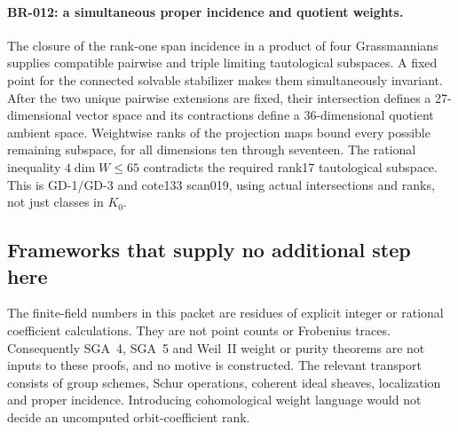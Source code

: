 \paragraph{BR-012: a simultaneous proper incidence and quotient weights.}
The closure of the rank-one span incidence in a product of four
Grassmannians supplies compatible pairwise and triple limiting
tautological subspaces. A fixed point for the connected solvable
stabilizer makes them simultaneously invariant. After the two unique
pairwise extensions are fixed, their intersection defines a
27-dimensional vector space and its contractions define a
36-dimensional quotient ambient space. Weightwise ranks of the
projection maps bound every possible remaining subspace, for all
dimensions ten through seventeen. The rational inequality
$4\dim W\le65$ contradicts the required rank17 tautological
subspace. This is GD-1/GD-3 and cote133 scan019, using actual
intersections and ranks, not just classes in $K_0$.

\subsection{Frameworks that supply no additional step here}
The finite-field numbers in this packet are residues of explicit
integer or rational coefficient calculations. They are not point counts
or Frobenius traces. Consequently SGA~4, SGA~5 and Weil~II weight or
purity theorems are not inputs to these proofs, and no motive is
constructed. The relevant transport consists of group schemes,
Schur operations, coherent ideal sheaves, localization and proper
incidence. Introducing cohomological weight language would not decide
an uncomputed orbit-coefficient rank.
